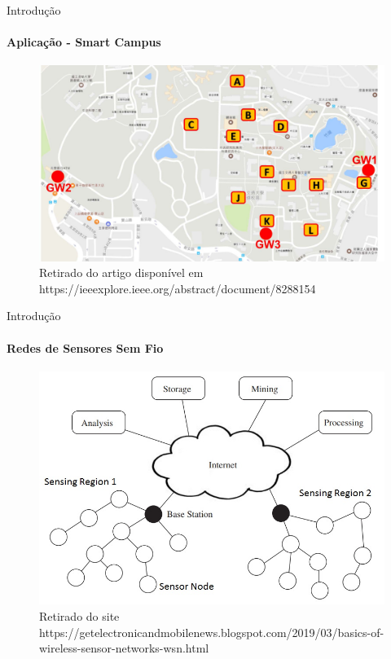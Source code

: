 \documentclass[t]{beamer}
\begin{document}
\begin{darkframes}
  \begin{frame}{Introdução}
    \framesubtitle{Aplicação - Smart Campus}
    \begin{figure}[ht]
      \centering
      \includegraphics[width=.9\textwidth]{resources/smart-campus-locations.png}\\
      \footnotesize{Retirado do artigo disponível em https://ieeexplore.ieee.org/abstract/document/8288154}
    \end{figure}
  \end{frame}

  \begin{frame}{Introdução}
    \framesubtitle{Redes de Sensores Sem Fio}
    \begin{figure}[ht]
      \centering
      \includegraphics[width=.8\textwidth]{resources/Wireless-Sensor-Networks-WSN.jpg}\\
      \footnotesize{Retirado do site https://getelectronicandmobilenews.blogspot.com/2019/03/basics-of-wireless-sensor-networks-wsn.html}
    \end{figure}
  \end{frame}



\end{darkframes}
\end{document}
